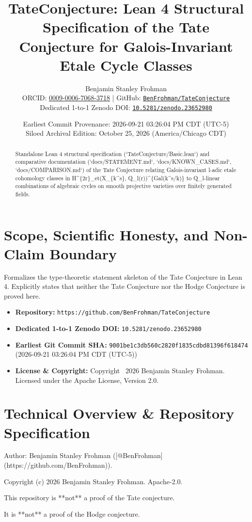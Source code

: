\documentclass[11pt,a4paper]{article}
\title{\textbf{TateConjecture: Lean 4 Structural Specification of the Tate Conjecture for Galois-Invariant Etale Cycle Classes}}
\author{Benjamin Stanley Frohman\\
\small ORCID: \href{https://orcid.org/0009-0006-7068-3718}{0009-0006-7068-3718} \quad|\quad
GitHub: \href{https://github.com/BenFrohman/TateConjecture}{\texttt{BenFrohman/TateConjecture}}\\
\small Dedicated 1-to-1 Zenodo DOI: \href{https://doi.org/10.5281/zenodo.23652980}{\texttt{10.5281/zenodo.23652980}}}
\date{Earliest Commit Provenance: 2026-09-21 03:26:04 PM CDT (UTC-5)\\
Siloed Archival Edition: October 25, 2026 (America/Chicago CDT)}
\begin{document}
\maketitle

\begin{abstract}
Standalone Lean 4 structural specification (`TateConjecture/Basic.lean`) and comparative documentation (`docs/STATEMENT.md`, `docs/KNOWN\_CASES.md`, `docs/COMPARISON.md`) of the Tate Conjecture relating Galois-invariant l-adic etale cohomology classes in H\textasciicircum{}\{2r\}\_et(X\_\{k\textasciicircum{}s\}, Q\_l(r))\textasciicircum{}\{Gal(k\textasciicircum{}s/k)\} to Q\_l-linear combinations of algebraic cycles on smooth projective varieties over finitely generated fields.
\end{abstract}

\section{Scope, Scientific Honesty, and Non-Claim Boundary}
Formalizes the type-theoretic statement skeleton of the Tate Conjecture in Lean 4. Explicitly states that neither the Tate Conjecture nor the Hodge Conjecture is proved here.

\begin{itemize}
  \item \textbf{Repository:} \texttt{https://github.com/BenFrohman/TateConjecture}
  \item \textbf{Dedicated 1-to-1 Zenodo DOI:} \texttt{10.5281/zenodo.23652980}
  \item \textbf{Earliest Git Commit SHA:} \texttt{9001be1c3db560c2820f1835cdbd81396f618474} (2026-09-21 03:26:04 PM CDT (UTC-5))
  \item \textbf{License \& Copyright:} Copyright \textcopyright\ 2026 Benjamin Stanley Frohman. Licensed under the Apache License, Version 2.0.
\end{itemize}

\section{Technical Overview \& Repository Specification}
Author: Benjamin Stanley Frohman ([@BenFrohman](https://github.com/BenFrohman)).

Copyright (c) 2026 Benjamin Stanley Frohman. Apache-2.0.

This repository is **not** a proof of the Tate conjecture.

It is **not** a proof of the Hodge conjecture.
\end{document}
